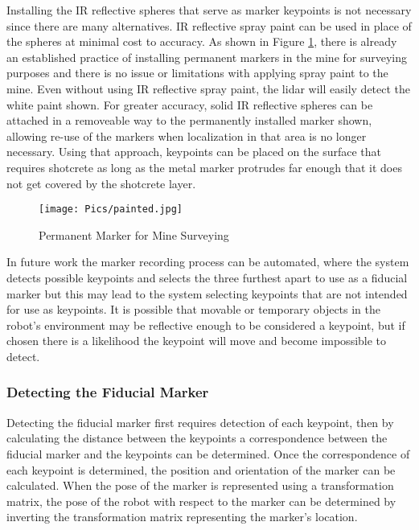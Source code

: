 Installing the IR reflective spheres that serve as marker keypoints is not necessary since there are many alternatives. IR reflective spray paint can be used in place of the spheres at minimal cost to accuracy. As shown in Figure \ref{fig:minepaint}, there is already an established practice of installing permanent markers in the mine for surveying purposes and there is no issue or limitations with applying spray paint to the mine. Even without using IR reflective spray paint, the \acrshort{lidar} will easily detect the white paint shown. For greater accuracy, solid IR reflective spheres can be attached in a removeable way to the permanently installed marker shown, allowing re-use of the markers when localization in that area is no longer necessary. Using that approach, keypoints can be placed on the surface that requires shotcrete as long as the metal marker protrudes far enough that it does not get covered by the shotcrete layer.\\

\begin{figure}
    \centering
\texttt{[image: Pics/painted.jpg]} 
    \caption{Permanent Marker for Mine Surveying}
    \label{fig:minepaint}
\end{figure}

In future work the marker recording process can be automated, where the system detects possible keypoints and selects the three furthest apart to use as a fiducial marker but this may lead to the system selecting keypoints that are not intended for use as keypoints. It is possible that movable or temporary objects in the robot's environment may be reflective enough to be considered a keypoint, but if chosen there is a likelihood the keypoint will move and become impossible to detect.\\

\subsubsection{Detecting the Fiducial Marker}

Detecting the fiducial marker first requires detection of each keypoint, then by calculating the distance between the keypoints a correspondence between the fiducial marker and the keypoints can be determined. Once the correspondence of each keypoint is determined, the position and orientation of the marker can be calculated. When the pose of the marker is represented using a transformation matrix, the pose of the robot with respect to the marker can be determined by inverting the transformation matrix representing the marker's location.\\

